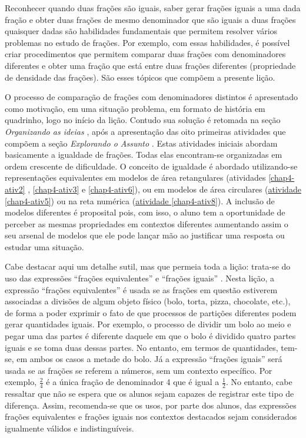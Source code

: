 

\noindent {\color{special}{\Large \bf LIÇÃO 4 -  Para o professor}}
\vspace{.5cm}

\begin{multicols}{2}
\noindent Reconhecer quando duas frações são iguais, saber gerar frações iguais a uma
dada fração e obter duas frações de mesmo denominador que são iguais a duas
frações quaisquer dadas são habilidades fundamentais que permitem resolver
vários problemas no estudo de frações.  Por exemplo, com essas habilidades, é
possível criar procedimentos que permitem comparar duas frações com
denominadores diferentes e obter uma fração que está entre duas frações
diferentes (propriedade de densidade das frações). São esses tópicos que compõem
a presente lição.

  O processo de comparação de frações com denominadores distintos é apresentado
como motivação, em uma situação problema, em formato de história em quadrinho,
logo no início da lição. Contudo sua solução é retomada na seção   {\it
Organizando as ideias}  , após a apresentação das oito primeiras atividades que
compõem a seção   {\it Explorando o Assunto}  . Estas atividades iniciais
abordam basicamente a igualdade de frações. Todas elas encontram-se organizadas
em ordem crescente de dificuldade. O conceito de igualdade é abordado
utilizando-se representações equivalentes em modelos de área retangulares
(atividades \ref{chap4-ativ2}  , \ref{chap4-ativ3}   e \ref{chap4-ativ6}), ou em modelos de área circulares (\hyperref[chap4-ativ5]{atividade \ref{chap4-ativ5}}) ou na
reta numérica (\hyperref[chap4-ativ5]{atividade \ref{chap4-ativ8}}). A inclusão de modelos diferentes é proposital pois,
com isso, o aluno tem a oportunidade de perceber as mesmas propriedades em
contextos diferentes aumentando assim o seu arsenal de modelos que ele pode
lançar mão ao justificar uma resposta ou estudar uma situação.

  Cabe destacar aqui um detalhe sutil, mas que permeia toda a lição: trata-se do
uso das expressões   ``frações equivalentes''   e   ``frações iguais''  . Nesta
lição, a expressão   ``frações equivalentes''   é usada se as frações em questão
estiverem associadas a divisões de algum objeto físico (bolo, torta, pizza,
chocolate, etc.), de forma a poder exprimir o fato de que processos de partições
diferentes podem gerar quantidades iguais. Por exemplo, o processo de dividir um
bolo ao meio e pegar uma das partes é diferente daquele em que o bolo é dividido
quatro partes iguais e se toma duas dessas partes. No entanto, em termos de
quantidades, tem-se, em ambos os casos a metade do bolo. Já a expressão
``frações iguais''   será usada se as frações se referem a números, sem um
contexto específico. Por exemplo,   $\frac{2}{4}$   é a única fração de
denominador 4 que é igual a   $\frac{1}{2}$. No entanto, cabe ressaltar que não
se espera que os alunos sejam capazes de registrar este tipo de diferença.
Assim, recomenda-se que os usos, por parte dos alunos, das expressões frações
equivalentes e frações iguais nos contextos destacados sejam considerados
igualmente válidos e indistinguíveis.


\end{multicols}
